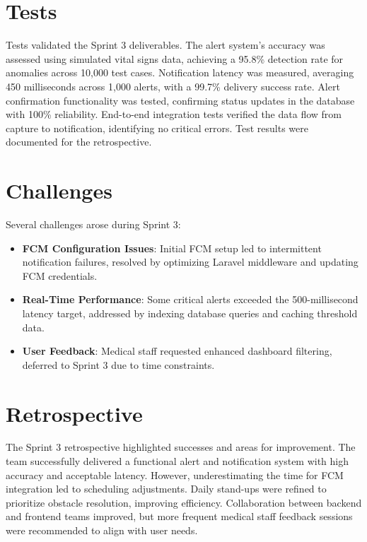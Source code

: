 \section{Tests}
Tests validated the Sprint 3 deliverables. The alert system’s accuracy was assessed using simulated vital signs data, achieving a 95.8\% detection rate for anomalies across 10,000 test cases. Notification latency was measured, averaging 450 milliseconds across 1,000 alerts, with a 99.7\% delivery success rate. Alert confirmation functionality was tested, confirming status updates in the database with 100\% reliability. End-to-end integration tests verified the data flow from capture to notification, identifying no critical errors. Test results were documented for the retrospective.

\section{Challenges}
Several challenges arose during Sprint 3:
\begin{itemize}
    \item \textbf{FCM Configuration Issues}: Initial FCM setup led to intermittent notification failures, resolved by optimizing Laravel middleware and updating FCM credentials.
    \item \textbf{Real-Time Performance}: Some critical alerts exceeded the 500-millisecond latency target, addressed by indexing database queries and caching threshold data.
    \item \textbf{User Feedback}: Medical staff requested enhanced dashboard filtering, deferred to Sprint 3 due to time constraints.
\end{itemize}

\section{Retrospective}
The Sprint 3 retrospective highlighted successes and areas for improvement. The team successfully delivered a functional alert and notification system with high accuracy and acceptable latency. However, underestimating the time for FCM integration led to scheduling adjustments. Daily stand-ups were refined to prioritize obstacle resolution, improving efficiency. Collaboration between backend and frontend teams improved, but more frequent medical staff feedback sessions were recommended to align with user needs.

